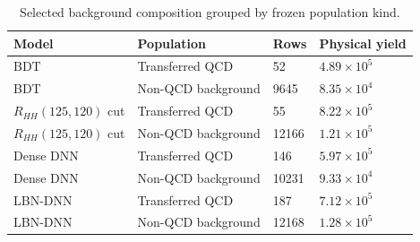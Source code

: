 \begin{table}[tb]
  \centering
  \footnotesize
  \caption{Selected background composition grouped by frozen population kind.}
  \label{tab:process-composition}
  \begin{tabular}{llll}
    \toprule
    Model & Population & Rows & Physical yield \\
    \midrule
    BDT & Transferred QCD & 52 & $4.89\times10^{5}$ \\
    BDT & Non-QCD background & 9645 & $8.35\times10^{4}$ \\
    $R_{HH}(125,120)$ cut & Transferred QCD & 55 & $8.22\times10^{5}$ \\
    $R_{HH}(125,120)$ cut & Non-QCD background & 12166 & $1.21\times10^{5}$ \\
    Dense DNN & Transferred QCD & 146 & $5.97\times10^{5}$ \\
    Dense DNN & Non-QCD background & 10231 & $9.33\times10^{4}$ \\
    LBN-DNN & Transferred QCD & 187 & $7.12\times10^{5}$ \\
    LBN-DNN & Non-QCD background & 12168 & $1.28\times10^{5}$ \\
    \bottomrule
  \end{tabular}
\end{table}
